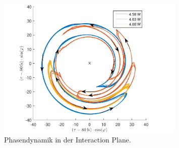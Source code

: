 \documentclass[bachelor,       %
               twoside,        %
               BCOR10mm,       %
               english,ngerman, %
               ]{GAUBM}
\begin{document}
 \begin{figure}[!htb]
	\centering
	\includegraphics[width=0.8\textwidth]{figures/4ms_25GSA_400m_MLrun_runBounceFix_InteractionPlaneArrows2.pdf}
	\caption{Phasendynamik in der Interaction Plane.}
	\label{fig:interactionPlane}
\end{figure}
\end{document}
